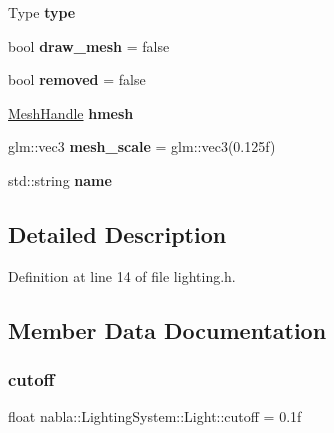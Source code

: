 \begin{DoxyCompactItemize}
Type {\bfseries type}
\item 
\mbox{\label{structnabla_1_1_lighting_system_1_1_light_aa58e5066ad58396647a64e734a207e97}} 
bool {\bfseries draw\+\_\+mesh} = false
\item 
\mbox{\label{structnabla_1_1_lighting_system_1_1_light_ad629148882377329964f7ae7be57008a}} 
bool {\bfseries removed} = false
\item 
\mbox{\label{structnabla_1_1_lighting_system_1_1_light_a4c9c855cf30d0d56a995b39ec91d81ea}} 
\mbox{\hyperlink{classnabla_1_1renderer_1_1_handle}{Mesh\+Handle}} {\bfseries hmesh}
\item 
\mbox{\label{structnabla_1_1_lighting_system_1_1_light_ab45615a7ffef718260eb311452694003}} 
glm\+::vec3 {\bfseries mesh\+\_\+scale} = glm\+::vec3(0.\+125f)
\item 
\mbox{\label{structnabla_1_1_lighting_system_1_1_light_aada6903bc46e980d2ac9e7738fcde20a}} 
std\+::string {\bfseries name}
\end{DoxyCompactItemize}


\subsection{Detailed Description}


Definition at line 14 of file lighting.\+h.



\subsection{Member Data Documentation}
\mbox{\label{structnabla_1_1_lighting_system_1_1_light_a29460f8211ce39180e34b82ce8ed33d4}} 
\subsubsection{\texorpdfstring{cutoff}{cutoff}}
{\footnotesize\ttfamily float nabla\+::\+Lighting\+System\+::\+Light\+::cutoff = 0.\+1f}

